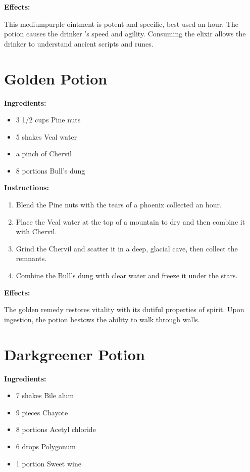 \documentclass{article}
\begin{document}
\textbf{Effects:}

This mediumpurple ointment is potent and specific, best used an hour. The potion causes the drinker 's speed and agility. Consuming the elixir allows the drinker to understand ancient scripts and runes.

\newpage
\section*{Golden Potion}

\textbf{Ingredients:}

\begin{itemize}
  \item 3 1/2 cups Pine nuts
  \item 5 shakes Veal water
  \item a pinch of Chervil
  \item 8 portions Bull's dung
\end{itemize}

\textbf{Instructions:}

\begin{enumerate}
  \item Blend the Pine nuts with the tears of a phoenix collected an hour.
  \item Place the Veal water at the top of a mountain to dry and then combine it with Chervil.
  \item Grind the Chervil and scatter it in a deep, glacial cave, then collect the remnants.
  \item Combine the Bull's dung with clear water and freeze it under the stars.
\end{enumerate}

\textbf{Effects:}

The golden remedy restores vitality with its dutiful properties of spirit. Upon ingestion, the potion bestows the ability to walk through walls.

\newpage
\section*{Darkgreener Potion}

\textbf{Ingredients:}

\begin{itemize}
  \item 7 shakes Bile alum
  \item 9 pieces Chayote
  \item 8 portions Acetyl chloride
  \item 6 drops Polygonum
  \item 1 portion Sweet wine
\end{itemize}
\end{document}
